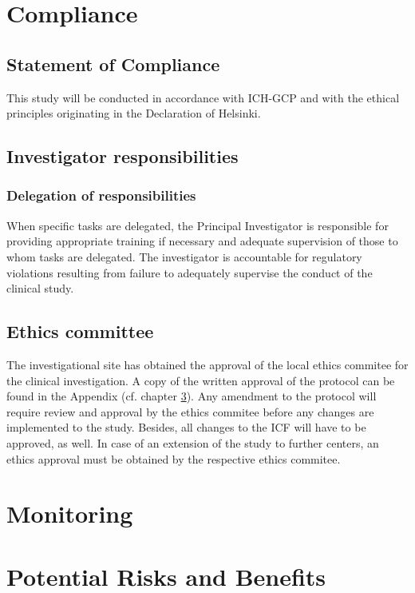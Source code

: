\documentclass[
	a4paper, 
	11.5pt,
	headings=small, 
	twoside, 
	titlepage=firstiscover, 
 	pagesize=auto,
  	version=last,
	open=any,
	BCOR=14mm,
  	chapterprefix=false]{scrbook}
\begin{document}
\section{Compliance}
\subsection{Statement of Compliance}
This study will be conducted in accordance with ICH-GCP and with the ethical principles originating in the Declaration of Helsinki. 

\subsection{Investigator responsibilities}

\subsubsection{Delegation of responsibilities}
When specific tasks are delegated, the Principal Investigator is responsible for providing appropriate training if necessary and adequate supervision of those to whom tasks are delegated. The investigator is accountable for regulatory violations resulting from failure to adequately supervise the conduct of the clinical study. 

\subsection{Ethics committee}
The investigational site has obtained the approval of the local ethics commitee for the clinical investigation. A copy of the written approval of the protocol can be found in the Appendix (cf. chapter \ref{}). Any amendment to the protocol will require review and approval by the ethics commitee before any changes are implemented to the study. Besides, all changes to the \ac{ICF} will have to be approved, as well. In case of an extension of the study to further centers, an ethics approval must be obtained by the respective ethics commitee. 

\section{Monitoring}

\section{Potential Risks and Benefits}
\end{document}
